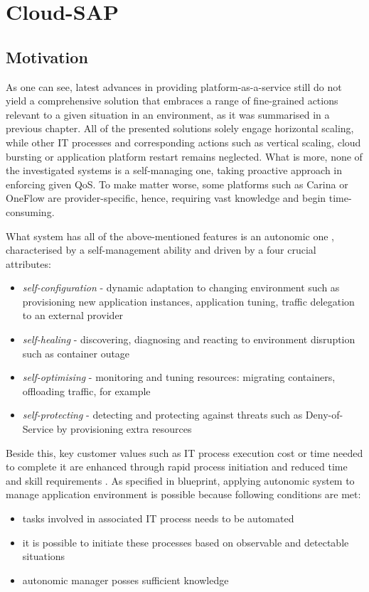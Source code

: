 \chapter{Cloud-SAP}


\section{Motivation}
As one can see, latest advances in providing platform-as-a-service still do not yield a comprehensive solution that embraces a range of fine-grained actions relevant to a given situation in an environment, as it was summarised in a previous chapter. All of the presented solutions solely engage horizontal scaling, while other IT processes and corresponding actions such as vertical scaling, cloud bursting or application platform restart remains neglected. What is more, none of the investigated systems is a self-managing one, taking proactive approach in enforcing given QoS. To make matter worse, some platforms such as Carina or OneFlow are provider-specific, hence, requiring vast knowledge and begin time-consuming.

What system has all of the above-mentioned features is an autonomic one \cite{IBM06}, characterised by a self-management ability and driven by a four crucial attributes:
\begin{itemize}
 \item \emph{self-configuration} - dynamic adaptation to changing environment such as provisioning new application instances, application tuning, traffic delegation to an external provider
  \item \emph{self-healing} - discovering, diagnosing and reacting to environment disruption such as container outage
  \item \emph{self-optimising} - monitoring and tuning resources: migrating containers, offloading traffic, for example
  \item \emph{self-protecting} - detecting and protecting against threats such as Deny-of-Service by provisioning extra resources
\end{itemize}
Beside this, key customer values such as IT process execution cost or time needed to complete it are enhanced through rapid process initiation and reduced time and skill requirements \cite{IBM06}. As specified in blueprint, applying autonomic system to manage application environment is possible because following conditions are met:
\begin{itemize}
  \item tasks involved in associated IT process needs to be automated
  \item it is possible to initiate these processes based on observable and detectable situations
  \item autonomic manager posses sufficient knowledge
\end{itemize}

